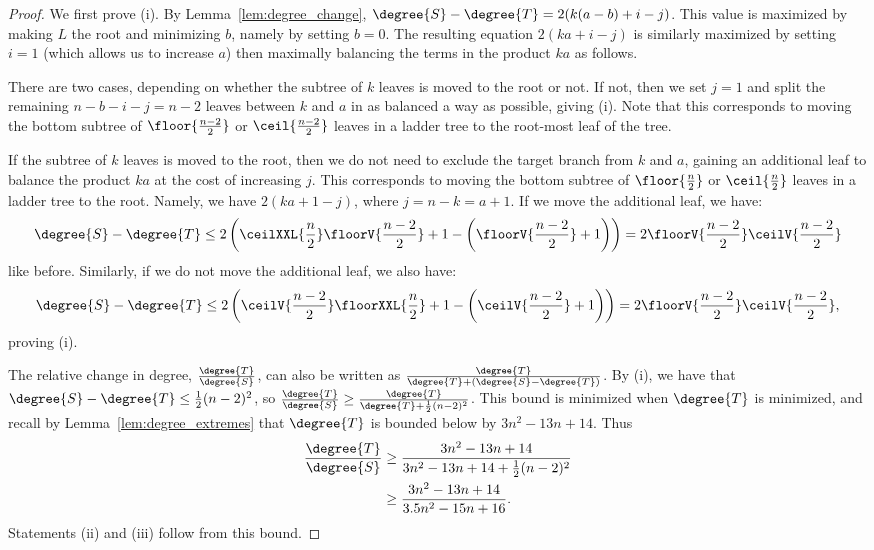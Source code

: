 \documentclass[11pt,onecolumn,conference]{IEEEtran}
\begin{document}
\begin{proof}
	We first prove (i).
	By Lemma~\ref{lem:degree_change}, $\degree{S} - \degree{T} = 2(k(a-b) + i - j)$.
	This value is maximized by making $L$ the root and minimizing $b$, namely by setting $b=0$.
	The resulting equation $2(ka + i - j)$ is similarly maximized by setting $i=1$ (which allows us to increase $a$) then maximally balancing the terms in the product $ka$ as follows.

	There are two cases, depending on whether the subtree of $k$ leaves is moved to the root or not.
    If not, then we set $j=1$ and split the remaining $n-b-i-j = n-2$ leaves between $k$ and $a$ in as balanced a way as possible, giving (i).
	Note that this corresponds to moving the bottom subtree of $\floor{\frac{n-2}{2}}$ or $\ceil{\frac{n-2}{2}}$ leaves in a ladder tree to the root-most leaf of the tree.

	If the subtree of $k$ leaves is moved to the root, then we do not need to exclude the target branch from $k$ and $a$, gaining an additional leaf to balance the product $ka$ at the cost of increasing $j$.
	This corresponds to moving the bottom subtree of $\floor{\frac{n}{2}}$ or $\ceil{\frac{n}{2}}$ leaves in a ladder tree to the root.
	Namely, we have $2(ka + 1 - j)$, where $j = n - k = a + 1$.
	If we move the additional leaf, we have:
$$\degree{S} - \degree{T} \le 2\left(\ceilXXL{\frac{n}{2}}\floorV{\frac{n-2}{2}}  + 1 - \left(\floorV{\frac{n-2}{2}} + 1\right)\right) = 2\floorV{\frac{n-2}{2}}\ceilV{\frac{n-2}{2}}$$
like before.
Similarly, if we do not move the additional leaf, we also have:
$$\degree{S} - \degree{T} \le 2 \left(\ceilV{\frac{n-2}{2}}\floorXXL{\frac{n}{2}} +1 -  \left(\ceilV{\frac{n-2}{2}} + 1\right)\right) = 2\floorV{\frac{n-2}{2}}\ceilV{\frac{n-2}{2}},$$
proving (i).

The relative change in degree, $\frac{\degree{T}}{\degree{S}}$, can also be written as $\frac{\degree{T}}{\degree{T} + (\degree{S} - \degree{T})}$.
By (i), we have that $\degree{S} - \degree{T} \le \frac{1}{2} (n-2)^2$,
so $\frac{\degree{T}}{\degree{S}} \ge \frac{\degree{T}}{\degree{T} + \frac{1}{2} (n-2)^2} $.
This bound is minimized when $\degree{T}$ is minimized, and recall by Lemma~\ref{lem:degree_extremes} that $\degree{T}$ is bounded below by $3n^2 - 13n + 14$.
	Thus
	\begin{align*}
		\frac{\degree{T}}{\degree{S}} &\ge \frac{3n^2 - 13n + 14}{3n^2 - 13n + 14 + \frac{1}{2}(n-2)^2} \\
		&\ge \frac{3n^2 - 13n + 14}{3.5n^2 - 15n + 16}.
	\end{align*}
	Statements (ii) and (iii) follow from this bound.

\end{proof}
\end{document}
